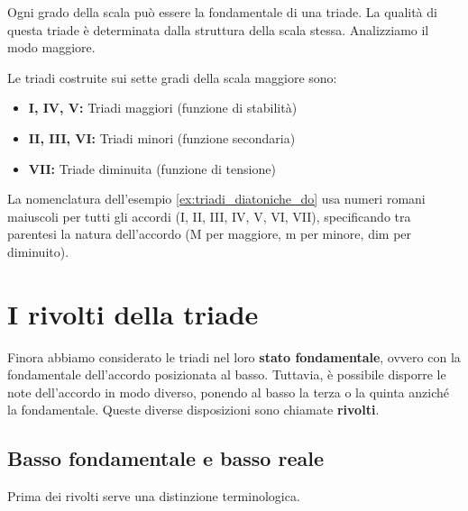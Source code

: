 Ogni grado della scala può essere la fondamentale di una triade. La qualità di questa triade è determinata dalla struttura della scala stessa. Analizziamo il modo maggiore.

\begin{definizione}
	\label{def:triadi_diatoniche_maggiore}
	Le triadi costruite sui sette gradi della scala maggiore sono:
	\begin{itemize}
		\item \textbf{I, IV, V:} Triadi maggiori (funzione di stabilità)
		\item \textbf{II, III, VI:} Triadi minori (funzione secondaria)
		\item \textbf{VII:} Triade diminuita (funzione di tensione)
	\end{itemize}
\end{definizione}

\begin{esempio}
	\label{ex:triadi_diatoniche_do}
\end{esempio}

La nomenclatura dell'esempio \ref{ex:triadi_diatoniche_do} usa numeri romani maiuscoli per tutti gli accordi (I, II, III, IV, V, VI, VII), specificando tra parentesi la natura dell'accordo (M per maggiore, m per minore, dim per diminuito).

\section{I rivolti della triade}
\label{sec:rivolti_triade}

Finora abbiamo considerato le triadi nel loro \textbf{stato fondamentale}, ovvero con la fondamentale dell'accordo posizionata al basso. Tuttavia, è possibile disporre le note dell'accordo in modo diverso, ponendo al basso la terza o la quinta anziché la fondamentale. Queste diverse disposizioni sono chiamate \textbf{rivolti}.

\subsection{Basso fondamentale e basso reale}
\label{subsec:basso_fondamentale_reale}

Prima dei rivolti serve una distinzione terminologica.


